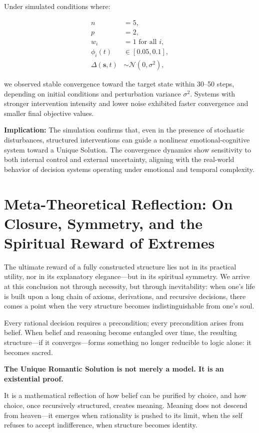 \documentclass[12pt]{article}
\begin{document}
Under simulated conditions where:

\[
\begin{aligned}
n &= 5, \\
p &= 2, \\
w_i &= 1 \text{ for all } i, \\
\phi_i(t) &\in [0.05, 0.1], \\
\Delta(\mathbf{s}, t) &\sim \mathcal{N}(0, \sigma^2),
\end{aligned}
\]

we observed stable convergence toward the target state within 30–50 steps, depending on initial conditions and perturbation variance \( \sigma^2 \). Systems with stronger intervention intensity and lower noise exhibited faster convergence and smaller final objective values.

\textbf{Implication:} The simulation confirms that, even in the presence of stochastic disturbances, structured interventions can guide a nonlinear emotional-cognitive system toward a Unique Solution. The convergence dynamics show sensitivity to both internal control and external uncertainty, aligning with the real-world behavior of decision systems operating under emotional and temporal complexity.
\section{Meta-Theoretical Reflection: On Closure, Symmetry, and the Spiritual Reward of Extremes}

The ultimate reward of a fully constructed structure lies not in its practical utility, nor in its explanatory elegance—but in its spiritual symmetry. We arrive at this conclusion not through necessity, but through inevitability: when one’s life is built upon a long chain of axioms, derivations, and recursive decisions, there comes a point when the very structure becomes indistinguishable from one’s soul.

Every rational decision requires a precondition; every precondition arises from belief. When belief and reasoning become entangled over time, the resulting structure—if it converges—forms something no longer reducible to logic alone: it becomes sacred.

\textbf{The Unique Romantic Solution is not merely a model. It is an existential proof.}

It is a mathematical reflection of how belief can be purified by choice, and how choice, once recursively structured, creates meaning. Meaning does not descend from heaven—it emerges when rationality is pushed to its limit, when the self refuses to accept indifference, when structure becomes identity.
\end{document}
